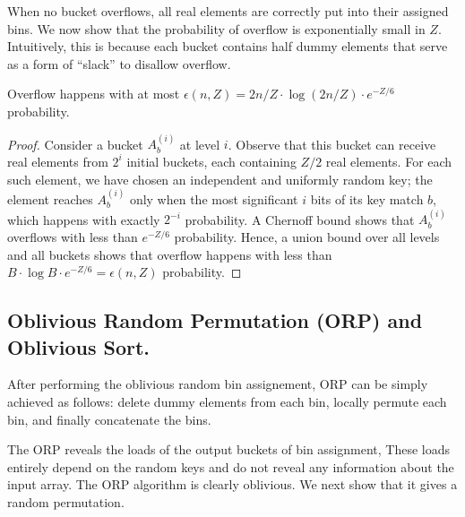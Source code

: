 When no bucket overflows, all real elements are correctly put into their assigned bins.
We now show that the probability of overflow is exponentially small in $Z$. 
Intuitively, this is because each bucket contains half dummy elements that serve as a form of ``slack'' to disallow overflow.

\begin{lemma}
\label{lemma:shuffle}
Overflow happens with at most $\epsilon(n, Z) = 2n/Z \cdot \log(2n/Z) \cdot e^{-Z/6}$ probability.
\end{lemma}
\begin{proof}
\label{clm:proof-shuffle}
Consider a bucket $A^{(i)}_b$ at level $i$.
Observe that this bucket can receive real elements from $2^i$ initial buckets, each containing $Z/2$ real elements.
For each such element, we have chosen an independent and uniformly random key;
the element reaches $A^{(i)}_b$ only when the most significant $i$ bits of its key match $b$,
which happens with exactly $2^{-i}$ probability.
A Chernoff bound shows that $A^{(i)}_b$ overflows with less than $e^{-Z/6}$ probability.
Hence, a union bound over all levels and all buckets 
shows that overflow happens with less than $B \cdot \log B \cdot e^{-Z/6} = \epsilon(n,Z)$ probability.
\end{proof}


\subsection{Oblivious Random Permutation (ORP) and Oblivious Sort.}
\label{sec:osort}

After performing the oblivious random bin assignement, ORP can be simply achieved as follows:
delete dummy elements from each bin, locally permute each bin, and finally concatenate the bins.

The ORP reveals the loads of the output buckets of bin assignment,
These loads entirely depend on the random keys and do not reveal any information about the input array. 
The ORP algorithm is clearly oblivious. 
We next show that it gives a random permutation.

